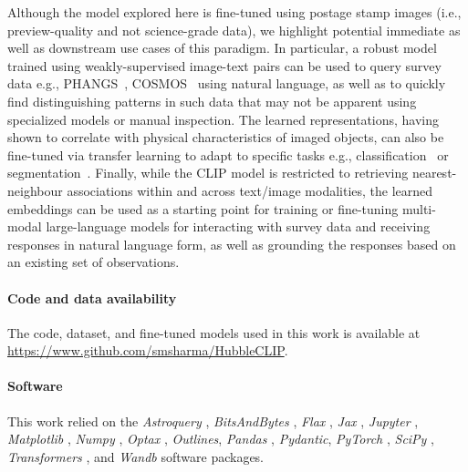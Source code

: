 \documentclass[10pt]{article} %
\newcommand{\package}[1]{\textsl{#1}\xspace}
\begin{document}
Although the model explored here is fine-tuned using postage stamp images (i.e., preview-quality and not science-grade data), we highlight potential immediate as well as downstream use cases of this paradigm.
%
In particular, a robust model trained using weakly-supervised image-text pairs can be used to query survey data e.g., PHANGS~\citep{lee2022phangs}, COSMOS~\citep{scoville2007cosmic} using natural language, as well as to quickly find distinguishing patterns in such data that may not be apparent using specialized models or manual inspection.
%
The learned representations, having shown to correlate with physical characteristics of imaged objects, can also be fine-tuned via transfer learning to adapt to specific tasks e.g., classification~\citep{wei2020deep} or segmentation~\citep{hausen2020morpheus}.
%
Finally, while the CLIP model is restricted to retrieving nearest-neighbour associations within and across text/image modalities, the learned embeddings can be used as a starting point for training or fine-tuning multi-modal large-language models for interacting with survey data and receiving responses in natural language form, as well as grounding the responses based on an existing set of observations.

\paragraph*{Code and data availability}

The code, dataset, and fine-tuned models used in this work is available at \url{https://www.github.com/smsharma/HubbleCLIP}.

\paragraph*{Software}

This work relied on the \package{Astroquery} \citep{2019AJ....157...98G}, \package{BitsAndBytes} \citep{dettmers2022llmint8}, \package{Flax} \citep{flax2020github}, \package{Jax} \citep{jax2018github}, \package{Jupyter} \citep{Kluyver2016jupyter}, \package{Matplotlib} \citep{Hunter:2007}, \package{Numpy} \citep{harris2020array}, \package{Optax} \citep{deepmind2020jax}, \package{Outlines}, \package{Pandas} \citep{2020SciPy-NMeth}, \package{Pydantic}, \package{PyTorch} \citep{paszke2019pytorch}, \package{SciPy} \citep{2020SciPy-NMeth}, \package{Transformers} \citep{wolf2019huggingface}, and \package{Wandb} \citep{wandb} software packages.


\end{document}

